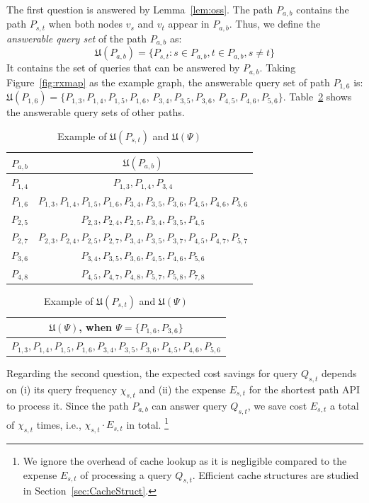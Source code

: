 \documentclass{sig-alternate}
\begin{document}
The first question is answered by Lemma~\ref{lem:oss}.
The path $P_{a,b}$ contains the path $P_{s,t}$ when both nodes $v_s$ and $v_t$ appear in $P_{a,b}$.
Thus, we define the {\em answerable query set} of the path $P_{a,b}$ as:
\begin{equation} \label{eq:phi}
 \mathfrak{U} (  P_{a,b} ) = \{ P_{s,t} : s \in P_{a,b}, t \in P_{a,b}, s \neq t \}
\end{equation}
It contains the set of queries that can be answered by $P_{a,b}$.
Taking Figure~\ref{fig:rxmap} as the example graph, the answerable query set
of path $P_{1,6}$ is: $\mathfrak{U} (  P_{1,6} ) = \{ P_{1,3},P_{1,4},P_{1,5},P_{1,6}$,
$P_{3,4},P_{3,5},P_{3,6}$, $P_{4,5},P_{4,6},P_{5,6} \}$.
Table~\ref{tbl:subpath} shows the answerable query sets of other paths.



\begin{table}
\center
    \begin{tabular}{|@{ }c@{ }|@{ }c@{ }|}
        \hline
        $P_{a,b}$           &  $\mathfrak{U}(P_{a,b})$ \\ \hline
        $P_{1,4}$      	    & $P_{1,3},P_{1,4},P_{3,4}$ \\
        $P_{1,6}$  	        & $P_{1,3},P_{1,4},P_{1,5},P_{1,6},P_{3,4},P_{3,5},P_{3,6},P_{4,5},P_{4,6},P_{5,6}$\\
        $P_{2,5}$   	    & $P_{2,3},P_{2,4},P_{2,5},P_{3,4},P_{3,5},P_{4,5}$ \\
        $P_{2,7}$      	    & $P_{2,3},P_{2,4},P_{2,5},P_{2,7},P_{3,4},P_{3,5},P_{3,7},P_{4,5},P_{4,7},P_{5,7}$ \\
        $P_{3,6}$       	& $P_{3,4},P_{3,5},P_{3,6},P_{4,5},P_{4,6},P_{5,6}$ \\
        $P_{4,8}$       	& $P_{4,5},P_{4,7},P_{4,8},P_{5,7},P_{5,8},P_{7,8}$ \\ \hline
    \end{tabular}
    \begin{tabular}{|c|}
        \hline
        $\mathfrak{U}(\Psi)$, when $\Psi = \{P_{1,6},P_{3,6}\}$ \\ \hline
        $P_{1,3},P_{1,4},P_{1,5},P_{1,6},P_{3,4},P_{3,5},P_{3,6},P_{4,5},P_{4,6},P_{5,6}$ \\ \hline
    \end{tabular}
    \caption{Example of $\mathfrak{U}(P_{s,t})$ and $\mathfrak{U}(\Psi)$}
\label{tbl:subpath}
\end{table}


Regarding the second question, the expected cost savings for query $Q_{s,t}$ depends on
(i) its query frequency $\chi_{s,t}$ and (ii) the expense $E_{s,t}$ for the shortest path API to process it.
Since the path $P_{a,b}$ can answer query $Q_{s,t}$,
we save cost $E_{s,t}$ a total of $\chi_{s,t}$ times, i.e., $\chi_{s,t} \cdot E_{s,t}$ in total.%
\footnote{We ignore the overhead of cache lookup as it is negligible compared to the expense $E_{s,t}$ of processing a query $Q_{s,t}$.
Efficient cache structures are studied in Section~\ref{sec:CacheStruct}.}
\end{document}
